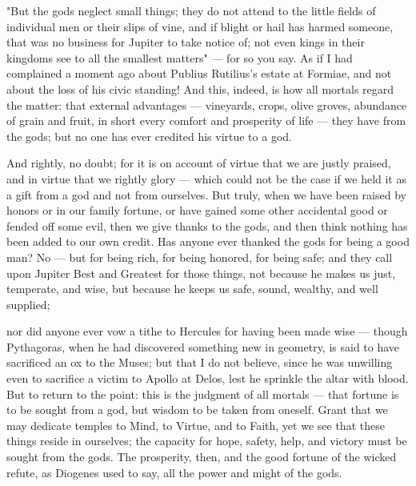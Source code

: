  "But the gods neglect small things; they do not attend to the little fields of individual men or their slips of vine, and if blight or hail has harmed someone, that was no business for Jupiter to take notice of; not even kings in their kingdoms see to all the smallest matters" — for so you say. As if I had complained a moment ago about Publius Rutilius's estate at Formiae, and not about the loss of his civic standing! And this, indeed, is how all mortals regard the matter: that external advantages — vineyards, crops, olive groves, abundance of grain and fruit, in short every comfort and prosperity of life — they have from the gods; but no one has ever credited his virtue to a god.

 And rightly, no doubt; for it is on account of virtue that we are justly praised, and in virtue that we rightly glory — which could not be the case if we held it as a gift from a god and not from ourselves. But truly, when we have been raised by honors or in our family fortune, or have gained some other accidental good or fended off some evil, then we give thanks to the gods, and then think nothing has been added to our own credit. Has anyone ever thanked the gods for being a good man? No — but for being rich, for being honored, for being safe; and they call upon Jupiter Best and Greatest for those things, not because he makes us just, temperate, and wise, but because he keeps us safe, sound, wealthy, and well supplied;

 nor did anyone ever vow a tithe to Hercules for having been made wise — though Pythagoras, when he had discovered something new in geometry, is said to have sacrificed an ox to the Muses; but that I do not believe, since he was unwilling even to sacrifice a victim to Apollo at Delos, lest he sprinkle the altar with blood. But to return to the point: this is the judgment of all mortals — that fortune is to be sought from a god, but wisdom to be taken from oneself. Grant that we may dedicate temples to Mind, to Virtue, and to Faith, yet we see that these things reside in ourselves; the capacity for hope, safety, help, and victory must be sought from the gods. The prosperity, then, and the good fortune of the wicked refute, as Diogenes used to say, all the power and might of the gods.

